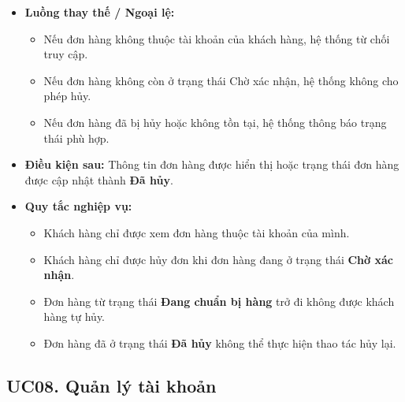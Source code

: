 \documentclass[12pt,a4paper]{article}
\begin{document}
\begin{itemize}
\begin{enumerate}
  \item Hệ thống thông báo kết quả cho khách hàng.

 \end{enumerate}

 \item \textbf{Luồng thay thế / Ngoại lệ:}

 \begin{itemize}

  \item Nếu đơn hàng không thuộc tài khoản của khách hàng, hệ thống từ chối truy cập.

  \item Nếu đơn hàng không còn ở trạng thái Chờ xác nhận, hệ thống không cho phép hủy.

  \item Nếu đơn hàng đã bị hủy hoặc không tồn tại, hệ thống thông báo trạng thái phù hợp.

 \end{itemize}

 \item \textbf{Điều kiện sau:} Thông tin đơn hàng được hiển thị hoặc trạng thái đơn hàng được cập nhật thành \textbf{Đã hủy}.

 \item \textbf{Quy tắc nghiệp vụ:}

\begin{itemize}

    \item Khách hàng chỉ được xem đơn hàng thuộc tài khoản của mình.

    \item Khách hàng chỉ được hủy đơn khi đơn hàng đang ở trạng thái \textbf{Chờ xác nhận}.

    \item Đơn hàng từ trạng thái \textbf{Đang chuẩn bị hàng} trở đi không được khách hàng tự hủy.

    \item Đơn hàng đã ở trạng thái \textbf{Đã hủy} không thể thực hiện thao tác hủy lại.

\end{itemize}

\end{itemize}


\subsection*{UC08. Quản lý tài khoản}
\end{document}
